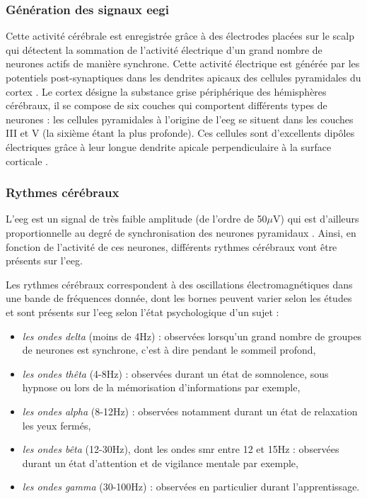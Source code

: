\subsubsection{Génération des signaux \gls{eegi}}

Cette activité cérébrale est enregistrée grâce à des électrodes placées sur le scalp qui détectent la sommation de l'activité électrique d'un grand nombre de neurones actifs de manière synchrone.
Cette activité électrique est générée par les potentiels post-synaptiques dans les dendrites apicaux des cellules pyramidales du cortex \citep{Hallez2007}. Le cortex désigne 
la substance grise périphérique des hémisphères cérébraux, il se compose de six couches qui comportent différents types de neurones : les cellules pyramidales à l'origine de l'\gls{eeg} 
se situent dans les couches III et V (la sixième étant la plus profonde). Ces cellules sont d'excellents dipôles électriques grâce à leur longue dendrite apicale perpendiculaire 
à la surface corticale \citep{Bekkers2011}. 

\subsubsection{Rythmes cérébraux}

L'\gls{eeg} est un signal de très faible amplitude (de l'ordre de 50$\mu$V) qui est d'ailleurs proportionnelle au degré de synchronisation des neurones pyramidaux \citep{Hallez2007}. 
Ainsi, en fonction de l'activité de ces neurones, différents rythmes cérébraux vont être présents sur l'\gls{eeg}. 

Les rythmes cérébraux correspondent à des oscillations électromagnétiques dans une bande de fréquences donnée, dont les bornes peuvent varier selon les études et sont présents sur l'\gls{eeg}
selon l'état psychologique d'un sujet \citep{Marzbani2016} :  
\begin{itemize}
\item \emph{les ondes delta} (moins de 4Hz) : observées lorsqu'un grand nombre de groupes de neurones est synchrone, c'est à dire pendant le sommeil profond,
\item \emph{les ondes thêta} (4-8Hz) : observées durant un état de somnolence, sous hypnose ou lors de la mémorisation d'informations par exemple,
\item \emph{les ondes alpha} (8-12Hz) : observées notamment durant un état de relaxation les yeux fermés,
\item \emph{les ondes bêta} (12-30Hz), dont les ondes \gls{smr} entre 12 et 15Hz : observées durant un état d'attention et de vigilance mentale par exemple,
\item \emph{les ondes gamma} (30-100Hz) : observées en particulier durant l'apprentissage.
\end{itemize}

